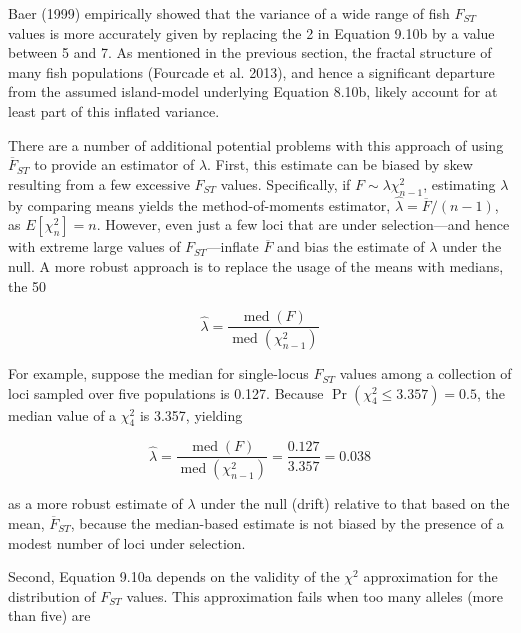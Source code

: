 \documentclass{article}
\begin{document}
Baer (1999) empirically showed that the variance of a wide range of fish  $ F_{ST} $ values is more accurately given by replacing the 2 in Equation 9.10b by a value between 5 and 7. As mentioned in the previous section, the fractal structure of many fish populations (Fourcade et al. 2013), and hence a significant departure from the assumed island-model underlying Equation 8.10b, likely account for at least part of this inflated variance.

There are a number of additional potential problems with this approach of using  $ \overline{F}_{ST} $ to provide an estimator of  $ \lambda $. First, this estimate can be biased by skew resulting from a few excessive  $ F_{ST} $ values. Specifically, if  $ F \sim \lambda \chi_{n-1}^2 $, estimating  $ \lambda $ by comparing means yields the method-of-moments estimator,  $ \widehat{\lambda} = \overline{F} / (n - 1) $, as  $ E[\chi_n^2] = n $. However, even just a few loci that are under selection—and hence with extreme large values of  $ F_{ST} $—inflate  $ \overline{F} $ and bias the estimate of  $ \lambda $ under the null. A more robust approach is to replace the usage of the means with medians, the 50%

\begin{equation}
\widehat{\lambda}=\frac{\operatorname{med}(F)}{\operatorname{med}(\chi_{n-1}^{2})}
\tag{9.10c}
\label{eq:9_10c}
\end{equation}

For example, suppose the median for single-locus  $ F_{ST} $ values among a collection of loci sampled over five populations is 0.127. Because  $ \Pr(\chi_4^2 \leq 3.357) = 0.5 $, the median value of a  $ \chi_4^2 $ is 3.357, yielding

\begin{equation}
\widehat{\lambda}=\frac{\operatorname{med}(F)}{\operatorname{med}(\chi_{n-1}^{2})}=\frac{0.127}{3.357}=0.038
\end{equation}

as a more robust estimate of  $ \lambda $ under the null (drift) relative to that based on the mean,  $ \overline{F}_{ST} $, because the median-based estimate is not biased by the presence of a modest number of loci under selection.

Second, Equation 9.10a depends on the validity of the  $ \chi^{2} $ approximation for the distribution of  $ F_{ST} $ values. This approximation fails when too many alleles (more than five) are
\end{document}
